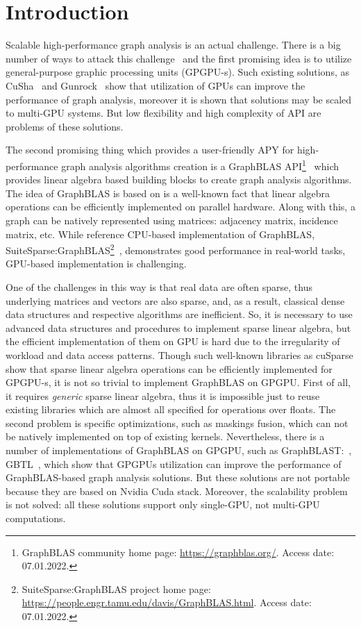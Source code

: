\section{Introduction}

Scalable high-performance graph analysis is an actual challenge.
There is a big number of ways to attack this challenge~\cite{Coimbra2021} and the first promising idea is to utilize general-purpose graphic processing units (GPGPU-s).
Such existing solutions, as CuSha~\cite{10.1145/2600212.2600227} and Gunrock~\cite{7967137} show that utilization of GPUs can improve the performance of graph analysis, moreover it is shown that solutions may be scaled to multi-GPU systems.
But low flexibility and high complexity of API are problems of these solutions.

The second promising thing which provides a user-friendly APY for high-performance graph analysis algorithms creation is a GraphBLAS API\footnote{GraphBLAS community home page: \url{https://graphblas.org/}. Access date: 07.01.2022.}~\cite{7761646} which provides linear algebra based building blocks to create graph analysis algorithms.
The idea of GraphBLAS is based on is a well-known fact that linear algebra operations can be efficiently implemented on parallel hardware.
Along with this, a graph can be natively represented using matrices: adjacency matrix, incidence matrix, etc.
While reference CPU-based implementation of GraphBLAS, SuiteSparse:GraphBLAS\footnote{SuiteSparse:GraphBLAS project home page: \url{https://people.engr.tamu.edu/davis/GraphBLAS.html}. Access date: 07.01.2022.}~\cite{10.1145/3322125}, demonstrates good performance in real-world tasks, GPU-based implementation is challenging.

One of the challenges in this way is that real data are often sparse, thus underlying matrices and vectors are also sparse, and, as a result, classical dense data structures and respective algorithms are inefficient. 
So, it is necessary to use advanced data structures and procedures to implement sparse linear algebra, but the efficient implementation of them on GPU is hard due to the irregularity of workload and data access patterns.
Though such well-known libraries as cuSparse show that sparse linear algebra operations can be efficiently implemented for GPGPU-s, it is not so trivial to implement GraphBLAS on GPGPU. 
First of all, it requires \textit{generic} sparse linear algebra, thus it is impossible just to reuse existing libraries which are almost all specified for operations over floats.
The second problem is specific optimizations, such as maskings fusion, which can not be natively implemented on top of existing kernels.
Nevertheless, there is a number of implementations of GraphBLAS on GPGPU, such as GraphBLAST:~\cite{yang2019graphblast}, GBTL~\cite{7529957}, which show that GPGPUs utilization can improve the performance of GraphBLAS-based graph analysis solutions.
But these solutions are not portable because they are based on Nvidia Cuda stack.
Moreover, the scalability problem is not solved: all these solutions support only single-GPU, not multi-GPU computations.

